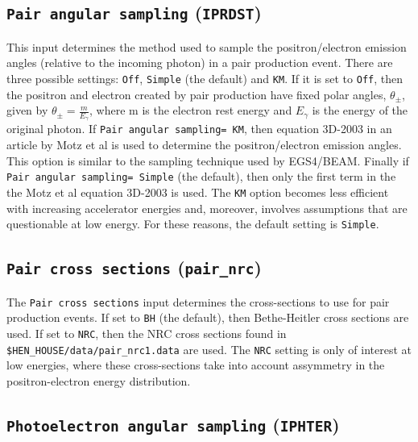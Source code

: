 \documentclass[12pt,twoside]{article}
\begin{document}
\subsection{ {\tt Pair angular sampling} ({\tt IPRDST})}

This input determines the method used to sample the positron/electron emission
angles (relative to the incoming photon) in a pair production event.  There
are three possible settings: {\tt Off}, {\tt Simple} (the default) and {\tt KM}.
If it is set to {\tt Off}, then the positron and electron created by pair
production have fixed polar angles, $\theta_{\pm}$, given by
$\theta_{\pm}=\frac{m}{E_{\gamma}}$, where m is the electron rest energy
and $E_{\gamma}$
is the energy of the original photon.
If {\tt Pair angular sampling= KM}, then equation 3D-2003 in an article
by Motz et al\cite{Mo69} is used to determine the positron/electron emission
angles.  This option is similar to the sampling technique used by
EGS4/BEAM.  Finally if {\tt Pair angular sampling= Simple} (the default), then only
the first term in the the Motz et al equation 3D-2003 is used.  The {\tt KM} option
becomes less efficient with increasing accelerator energies and, moreover, involves
assumptions that are questionable at low energy.  For these reasons, the default
setting is {\tt Simple}.

\subsection{ {\tt Pair cross sections} ({\tt pair\_nrc})}

The {\tt Pair cross sections} input determines the cross-sections to
use for pair production events.  If set to {\tt BH} (the default), then
Bethe-Heitler cross sections are used.  If set to {\tt NRC}, then the
NRC cross sections found in {\tt \$HEN\_HOUSE/data/pair\_nrc1.data} are
used.  The {\tt NRC} setting is only of interest at low energies, where
these cross-sections take into account assymmetry in the positron-electron
energy distribution.

\subsection{ {\tt Photoelectron angular sampling} ({\tt IPHTER})}
\end{document}
